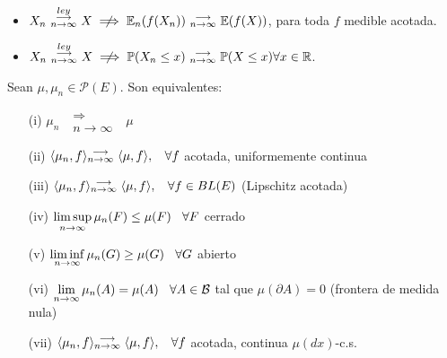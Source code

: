 \begin{remark}
\beforeitemize
\begin{itemize}
    \item $X_n\mbox{ }\overset{ley}{\substack{\longrightarrow \\n \to \infty}}\mbox{ }X \centernot\implies \mathbb{E}_n(f(X_n)) \mbox{ }\substack{\longrightarrow \\ n\to\infty}\mbox{ } \mathbb{E}(f(X))$, para toda $f$ medible acotada.
    \item $X_n\mbox{ }\overset{ley}{\substack{\longrightarrow \\n \to \infty}}\mbox{ }X \centernot\implies \mathbb{P}(X_n\leq x) \conv \mathbb{P}(X\leq x) \forall x \in \mathbb{R}$.
\end{itemize}

\end{remark}
\begin{theorem}[Portmanteau] Sean $\mu,\mu_n \in \mathcal{P}(E)$. Son equivalentes:
\label{portmanteau}
\begin{enumerate}
    \item[(i)] $\mu_n \mbox{ }\substack{\Longrightarrow \\n \to \infty}\mbox{ } \mu$
    \item[(ii)] $\langle \mu_n,f\rangle { }\substack{\longrightarrow \\ n\to\infty}\mbox{ } \langle \mu,f\rangle, \hspace{.25cm}\, \forall f$ acotada, uniformemente continua
    \item[(iii)]$\langle \mu_n,f\rangle { }\substack{\longrightarrow \\ n\to\infty}\mbox{ } \langle \mu,f\rangle, \hspace{.25cm}\, \forall f \in BL(E)$ (Lipschitz acotada)
    \item[(iv)] $\displaystyle\limsup_{n\to\infty} \mu_n (F)\leq\mu(F) \hspace{.25cm}\, \forall F $ cerrado
    \item[(v)] $\displaystyle\liminf_{n\to\infty} \mu_n (G)\geq\mu(G) \hspace{.25cm}\, \forall G $ abierto
    \item[(vi)] $\displaystyle\lim_{n\to\infty}\mu_n(A) = \mu(A) \hspace{.25cm}\, \forall A \in \mathcal{B}$ tal que $\mu(\partial A)=0$ (frontera de medida nula)
    \item[(vii)] $\langle \mu_n,f\rangle { }\substack{\longrightarrow \\ n\to\infty}\mbox{ } \langle \mu,f\rangle, \hspace{.25cm}\, \forall f$ acotada, continua $\mu(dx)$-c.s.
\end{enumerate}
\end{theorem}
